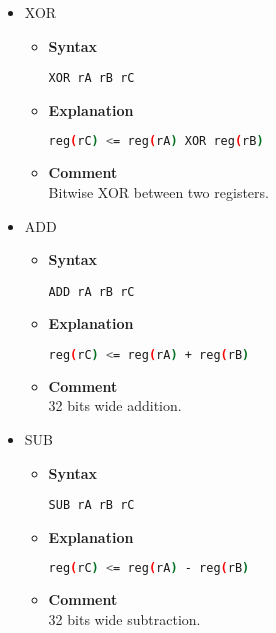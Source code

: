 \begin{itemize}
    \item XOR
    \begin{itemize}
        \item \textbf{Syntax}
        \begin{lstlisting}[language={[x86masm]Assembler}, frame=single]
    XOR rA rB rC
        \end{lstlisting}
        \item \textbf{Explanation}
        \begin{lstlisting}[language=bash, frame=single]
    reg(rC) <= reg(rA) XOR reg(rB)
        \end{lstlisting}
        \item \textbf{Comment} \\
    Bitwise XOR between two registers.
    \end{itemize}

    \item ADD
    \begin{itemize}
        \item \textbf{Syntax}
        \begin{lstlisting}[language={[x86masm]Assembler}, frame=single]
    ADD rA rB rC
        \end{lstlisting}
        \item \textbf{Explanation}
        \begin{lstlisting}[language=bash, frame=single]
    reg(rC) <= reg(rA) + reg(rB)
        \end{lstlisting}
        \item \textbf{Comment} \\
    32 bits wide addition.
    \end{itemize}

    \item SUB
    \begin{itemize}
        \item \textbf{Syntax}
        \begin{lstlisting}[language={[x86masm]Assembler}, frame=single]
    SUB rA rB rC
        \end{lstlisting}
        \item \textbf{Explanation}
        \begin{lstlisting}[language=bash, frame=single]
    reg(rC) <= reg(rA) - reg(rB)
        \end{lstlisting}
        \item \textbf{Comment} \\
    32 bits wide subtraction.
    \end{itemize}


\end{itemize}
